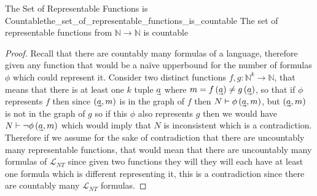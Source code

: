 \begin{proposition}{The Set of Representable Functions is
Countable}{the_set_of_representable_functions_is_countable}
The set of representable functions from \( \mathbb{N} \to \mathbb{N}  \) is
countable
\end{proposition}
\begin{proof}
    Recall that there are countably many formulas of a language, therefore given
    any function that would be a na\"ive upperbound for the number of formulas \(
    \phi  \) which could represent it. 
    Consider two distinct functions \( f, g : \mathbb{N} ^{ k }  \to \mathbb{N}
    \), that means that there is at least one \( k \) tuple \( \undervec{a} \)
    where \( m = f\left( \undervec{a} \right) \neq g\left( \undervec{a} \right)  \),
    so that if \( \phi  \) represents \( f \) then since \( \left( \undervec{a},
    m\right)  \) is in the graph of \( f \) then \( N \vdash \phi \left(
    \undervec{a}, m \right)  \), but \( \left( \undervec{a}, m \right)  \) is
    not in the graph of \( g \) so if this \( \phi  \) also represents \( g \)
    then we would have \( N \vdash \neg \phi \left( \undervec{a}, m \right)  \)
    which would imply that \( N \) is inconsistent which is a contradiction.\\
    Therefore if we assume for the sake of contradiction that there are
    uncountably many representable functions, that would mean that there are
    uncountably many formulas of \( \mathcal{ L } _{ NT }   \) since given two
    functions they will they will each have at least one formula which is
    different representing it, this is a contradiction since there are countably
    many \( \mathcal{ L } _{ NT }   \) formulas.
\end{proof}
